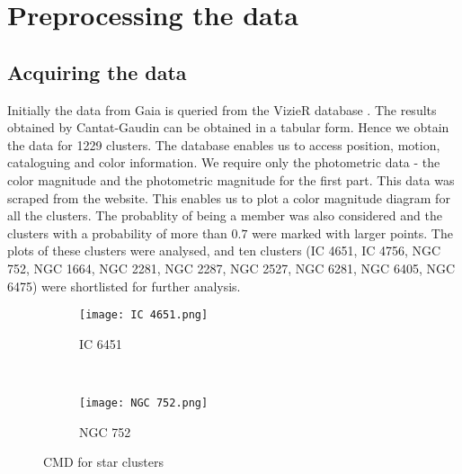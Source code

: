 \chapter{Preprocessing the data}\label{ch:ch2}

\section{Acquiring the data}
Initially the data from Gaia is queried from the VizieR database \citep{vizier}. The results obtained by Cantat-Gaudin \citep{cg} can be obtained in a tabular form. Hence we obtain the data for 1229 clusters. The database enables us to access position, motion, cataloguing and color information. We require only the photometric data - the color magnitude and the photometric magnitude for the first part. This data was scraped from the website. This enables us to plot a color magnitude diagram for all the clusters. The probablity of being a member was also considered and the clusters with a probability of more than $0.7$ were marked with larger points. The plots of these clusters were analysed, and ten clusters (IC 4651, IC 4756, NGC 752, NGC 1664, NGC 2281, NGC 2287, NGC 2527, NGC 6281, NGC 6405, NGC 6475) were shortlisted for further analysis.

\begin{figure}[h]
 \centering
 \begin{subfigure}[b]{0.45\textwidth}
   \centering
   \texttt{[image: IC 4651.png]}
   \caption{IC 6451}
   \label{fig:im1}
  \end{subfigure}
 ~
 \begin{subfigure}[b]{0.45\textwidth}
   \centering
   \texttt{[image: NGC 752.png]}
   \caption{NGC 752}
   \label{fig:im2}
 \end{subfigure}
 \caption{CMD for star clusters}
 \label{fig:subfigs_cap1}
\end{figure} 


 
 